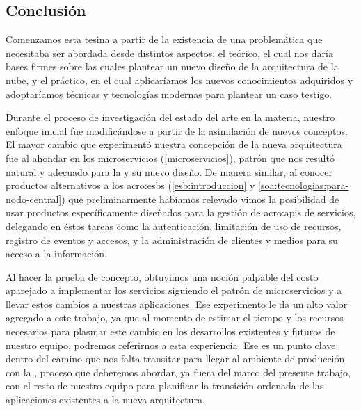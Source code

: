 \subsection{Conclusión}
\label{conclusion}

Comenzamos esta tesina a partir de la existencia de una problemática que necesitaba ser abordada desde distintos aspectos: el teórico, el cual nos daría bases firmes sobre las cuales plantear un nuevo diseño de la arquitectura de la nube, y el práctico, en el cual aplicaríamos los nuevos conocimientos adquiridos y adoptaríamos técnicas y tecnologías modernas para plantear un caso testigo.

Durante el proceso de investigación del estado del arte en la materia, nuestro enfoque inicial fue modificándose a partir de la asimilación de nuevos conceptos. El mayor cambio que experimentó nuestra concepción de la nueva arquitectura fue al ahondar en los microservicios (\autoref{microservicios}), patrón que nos resultó natural y adecuado para la {\cloud} y su nuevo diseño. De manera similar, al conocer productos alternativos a los \glspl{acro:esb} (\autoref{esb:introduccion} y \autoref{soa:tecnologias:para-nodo-central}) que preliminarmente habíamos relevado vimos la posibilidad de usar productos específicamente diseñados para la gestión de \glspl{acro:api} de servicios, delegando en éstos tareas como la autenticación, limitación de uso de recursos, registro de eventos y accesos, y la administración de clientes y medios para su acceso a la información.

Al hacer la prueba de concepto, obtuvimos una noción palpable del costo aparejado a implementar los servicios siguiendo el patrón de microservicios y a llevar estos cambios a nuestras aplicaciones. Ese experimento le da un alto valor agregado a este trabajo, ya que al momento de estimar el tiempo y los recursos necesarios para plasmar este cambio en los desarrollos existentes y futuros de nuestro equipo, podremos referirnos a esta experiencia. Ese es un punto clave dentro del camino que nos falta transitar para llegar al ambiente de producción con la {\cloud}, proceso que deberemos abordar, ya fuera del marco del presente trabajo, con el resto de nuestro equipo para planificar la transición ordenada de las aplicaciones existentes a la nueva arquitectura.

